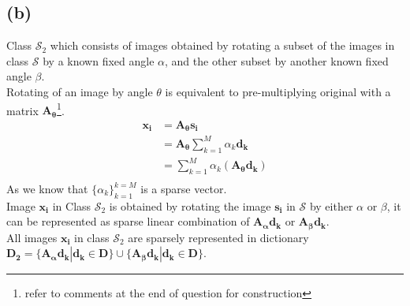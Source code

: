 \documentclass[fleqn, 11pt]{article}
\begin{document}
\subsection*{(b)}
Class $\mathcal{S}_2$ which consists of images obtained by rotating a subset of the images in class $\mathcal{S}$ by a known fixed angle $\alpha$, and the other subset by another known fixed angle $\beta$. \\
Rotating of an image by angle $\theta$ is equivalent to pre-multiplying original with a matrix $\boldsymbol{A_\theta}$\footnote{refer to comments at the end of question for construction}. \\
\begin{equation*}
    \begin{aligned}
        \boldsymbol{x_i} &= \boldsymbol{A_\theta} \boldsymbol{s_i} \\
            &= \boldsymbol{A_\theta} \sum_{k=1}^{M} \alpha_k \boldsymbol{d_k} \\
            &= \sum_{k=1}^{M} \alpha_k (\boldsymbol{A_\theta} \boldsymbol{d_k}) \\
    \end{aligned}
\end{equation*}
As we know that $\{\alpha_k\}_{k=1}^{k=M}$ is a sparse vector. \\
Image $\boldsymbol{x_i}$ in Class $\mathcal{S}_2$ is obtained by rotating the image $\boldsymbol{s_i}$ in $\mathcal{S}$ by either $\alpha$ or $\beta$, it can be represented as sparse linear combination of $\boldsymbol{A_\alpha} \boldsymbol{d_k}$ or $\boldsymbol{A_\beta} \boldsymbol{d_k}$. \\
All images $\boldsymbol{x_i}$ in class $\mathcal{S}_2$ are sparsely represented in dictionary $\boldsymbol{D_2} = \{\boldsymbol{A_\alpha} \boldsymbol{d_k} | \boldsymbol{d_k} \in \boldsymbol{D}\} \cup \{\boldsymbol{A_\beta} \boldsymbol{d_k} | \boldsymbol{d_k} \in \boldsymbol{D}\}$. \\

\medskip
\end{document}
